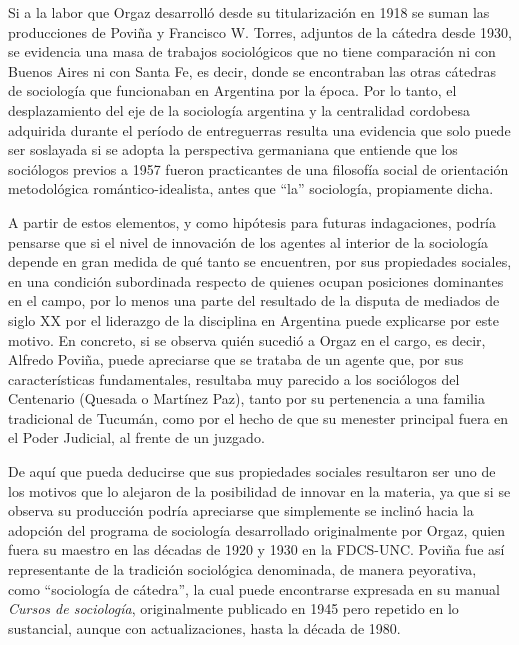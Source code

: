 Si a la labor que Orgaz desarrolló desde su titularización en 1918 se suman las producciones de Poviña y Francisco W. Torres, adjuntos de la cátedra desde 1930, se evidencia una masa de trabajos sociológicos que no tiene comparación ni con Buenos Aires ni con Santa Fe, es decir, donde se encontraban las otras cátedras de sociología que funcionaban en Argentina por la época. Por lo tanto, el desplazamiento del eje de la sociología argentina y la centralidad cordobesa adquirida durante el período de entreguerras resulta una evidencia que solo puede ser soslayada si se adopta la perspectiva germaniana que entiende que los sociólogos previos a 1957 fueron practicantes de una filosofía social de orientación metodológica romántico-idealista, antes que ``la'' sociología, propiamente dicha.

A partir de estos elementos, y como hipótesis para futuras indagaciones, podría pensarse que si el nivel de innovación de los agentes al interior de la sociología depende en gran medida de qué tanto se encuentren, por sus propiedades sociales, en una condición subordinada respecto de quienes ocupan posiciones dominantes en el campo, por lo menos una parte del resultado de la disputa de mediados de siglo XX por el liderazgo de la disciplina en Argentina puede explicarse por este motivo. En concreto, si se observa quién sucedió a Orgaz en el cargo, es decir, Alfredo Poviña, puede apreciarse que se trataba de un agente que, por sus características fundamentales, resultaba muy parecido a los sociólogos del Centenario (Quesada o Martínez Paz), tanto por su pertenencia a una familia tradicional de Tucumán, como por el hecho de que su menester principal fuera en el Poder Judicial, al frente de un juzgado.

De aquí que pueda deducirse que sus propiedades sociales resultaron ser uno de los motivos que lo alejaron de la posibilidad de innovar en la materia, ya que si se observa su producción podría apreciarse que simplemente se inclinó hacia la adopción del programa de sociología desarrollado originalmente por Orgaz, quien fuera su maestro en las décadas de 1920 y 1930 en la FDCS-UNC. Poviña fue así representante de la tradición sociológica denominada, de manera peyorativa, como ``sociología de cátedra'', la cual puede encontrarse expresada en su manual \emph{Cursos de sociología}, originalmente publicado en 1945 pero repetido en lo sustancial, aunque con actualizaciones, hasta la década de 1980.

